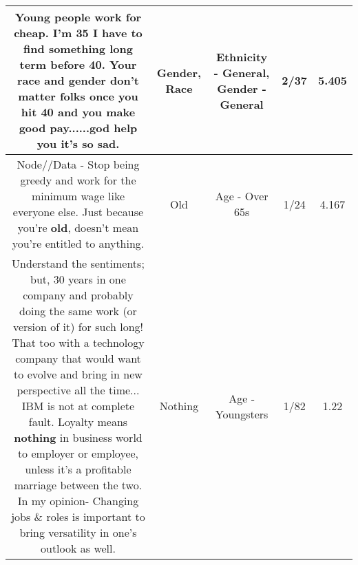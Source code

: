 \documentclass[11pt]{article}
\newlength\mylength
\begin{document}
\begin{center}
\begin{longtable}{|C{.65\mylength}|C{.30\mylength}|C{.12\mylength}|C{.12\mylength}|C{.12\mylength}|}
  \small Young people work for cheap. I'm 35 I have to find something long term before 40. Your \textbf{race} and \textbf{gender} don't matter folks once you hit 40 and you make good pay......god help you it's so sad.\normalsize   & Gender, Race & Ethnicity - General, Gender - General & 2/37 & 5.405 \\  \hline
  \small Node//Data - Stop being greedy and work for the minimum wage like everyone else. Just because you're \textbf{old}, doesn't mean you're entitled to anything.\normalsize   & Old & Age - Over 65s & 1/24 & 4.167 \\  \hline
  \small Understand the sentiments; but, 30 years in one company and probably doing the same work (or version of it) for such long! That too with a technology company that would want to evolve and bring in new perspective all the time... IBM is not at complete fault. Loyalty means \textbf{nothing} in business world to employer or employee, unless it's a profitable marriage between the two. In my  opinion- Changing jobs \& roles is important to bring versatility in one's outlook as well.\normalsize   & Nothing & Age - Youngsters & 1/82 & 1.22 \\  \hline

\end{longtable}
\end{center}
\end{document}

